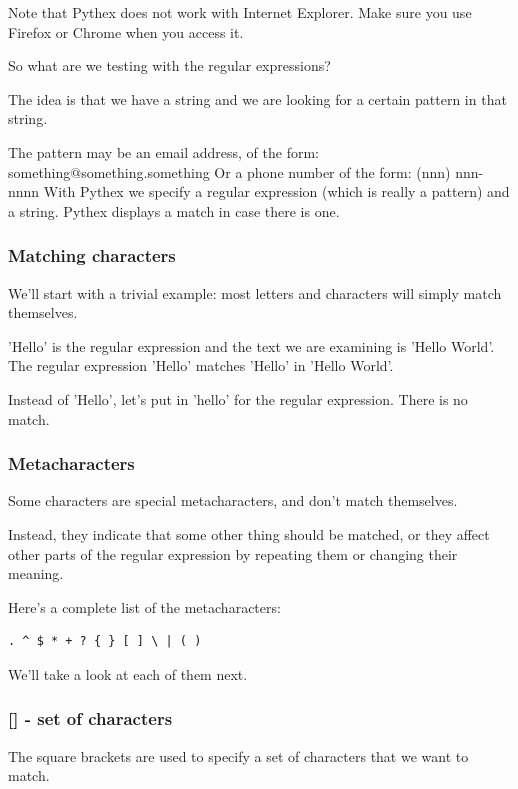 \documentclass{article}
\begin{document}
Note that Pythex does not work with Internet Explorer.  Make sure you use Firefox or Chrome when you access it.

So what are we testing with the regular expressions?

The idea is that we have a string and we are looking for a certain pattern in that string.

The pattern may be an email address, of the form: something@something.something
Or a phone number of the form:  (nnn) nnn-nnnn
With Pythex we specify a regular expression (which is really a pattern) and a string.  Pythex displays a match in case there is one.

\subsubsection{Matching characters}

We’ll start with a trivial example:  most letters and characters will simply match themselves.  

'Hello' is the regular expression and the text we are examining is 'Hello World'.  The regular expression 'Hello' matches 'Hello' in 'Hello World'.

Instead of 'Hello', let’s put in 'hello' for the regular expression.  There is no match.

\subsubsection{Metacharacters}

Some characters are special metacharacters, and don’t match themselves. 

Instead, they indicate that some other thing should be matched, or they affect other parts of the regular expression by repeating them or changing their meaning. 

Here’s a complete list of the metacharacters:

\begin{lstlisting}
. ^ $ * + ? { } [ ] \ | ( )
\end{lstlisting}

We'll take a look at each of them next.

\subsubsection{[] -  set of characters}
The square brackets are used to specify a set of characters that we want to match.
\end{document}
